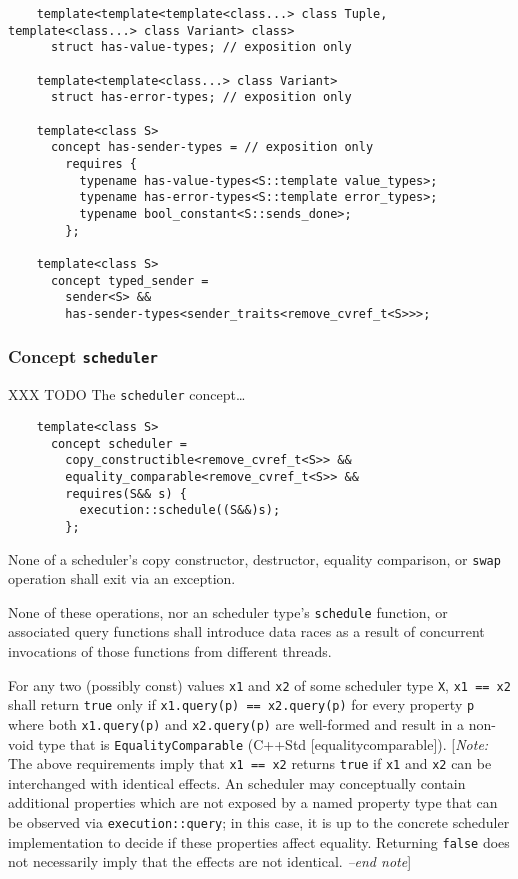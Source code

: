 \documentclass[a4paper,12pt,notitlepage,twoside,openright]{article}
\begin{document}
\begin{verbatim}
    template<template<template<class...> class Tuple, template<class...> class Variant> class>
      struct has-value-types; // exposition only

    template<template<class...> class Variant>
      struct has-error-types; // exposition only

    template<class S>
      concept has-sender-types = // exposition only
        requires {
          typename has-value-types<S::template value_types>;
          typename has-error-types<S::template error_types>;
          typename bool_constant<S::sends_done>;
        };

    template<class S>
      concept typed_sender =
        sender<S> &&
        has-sender-types<sender_traits<remove_cvref_t<S>>>;
\end{verbatim}

\hypertarget{concept-scheduler}{%
\subsubsection{\texorpdfstring{Concept
\texttt{scheduler}}{Concept }}\label{concept-scheduler}}

XXX TODO The \texttt{scheduler} concept\ldots{}

\begin{verbatim}
    template<class S>
      concept scheduler =
        copy_constructible<remove_cvref_t<S>> &&
        equality_comparable<remove_cvref_t<S>> &&
        requires(S&& s) {
          execution::schedule((S&&)s);
        };
\end{verbatim}

None of a scheduler's copy constructor, destructor, equality comparison,
or \texttt{swap} operation shall exit via an exception.

None of these operations, nor an scheduler type's
\texttt{schedule} function, or associated query functions
shall introduce data races as a result of concurrent invocations of
those functions from different threads.

For any two (possibly const) values \texttt{x1} and
\texttt{x2} of some scheduler type \texttt{X},
\texttt{x1 == x2} shall return \texttt{true}
only if \texttt{x1.query(p) == x2.query(p)} for every
property \texttt{p} where both
\texttt{x1.query(p)} and \texttt{x2.query(p)}
are well-formed and result in a non-void type that is
\texttt{EqualityComparable} (C++Std
{[}equalitycomparable{]}). {[}\emph{Note:} The above requirements imply
that \texttt{x1 == x2} returns \texttt{true} if
\texttt{x1} and \texttt{x2} can be interchanged
with identical effects. An scheduler may conceptually contain additional
properties which are not exposed by a named property type that can be
observed via \texttt{execution::query}; in this case, it is
up to the concrete scheduler implementation to decide if these
properties affect equality. Returning \texttt{false} does
not necessarily imply that the effects are not identical. \emph{--end
note}{]}
\end{document}
